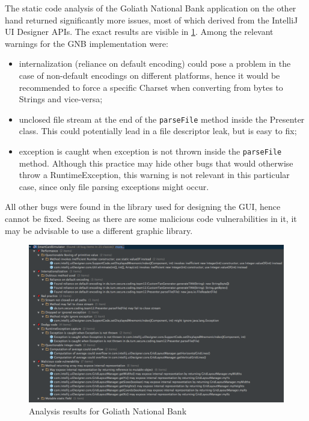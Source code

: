 The static code analysis of the Goliath National Bank application on the other hand returned significantly more issues, most of which derived from the IntelliJ UI Designer APIs.
The exact results are visible in \ref{figure:gnb_findBugs}.\newline
Among the relevant warnings for the GNB implementation were:
\begin{itemize}
	\item internalization (reliance on default encoding) could pose a problem in the case of non-default encodings on different platforms, hence it would be recommended to force a specific Charset when converting from bytes to Strings and vice-versa;
	\item unclosed file stream at the end of the \texttt{parseFile} method inside the Presenter class. This could potentially lead in a file descriptor leak, but is easy to fix;
	\item exception is caught when exception is not thrown inside the \texttt{parseFile} method. Although this practice may hide other bugs that would otherwise throw a RuntimeException, this warning is not relevant in this particular case, since only file parsing exceptions might occur.
\end{itemize}
All other bugs were found in the library used for designing the GUI, hence cannot be fixed. Seeing as there are some malicious code vulnerabilities in it, it may be advisable to use a different graphic library.

\begin{figure}
	\centering
	\includegraphics[width=\textwidth]{figures/gnb_findBugs}
	\caption{Analysis results for Goliath National Bank}
	\label{figure:gnb_findBugs}
\end{figure}

